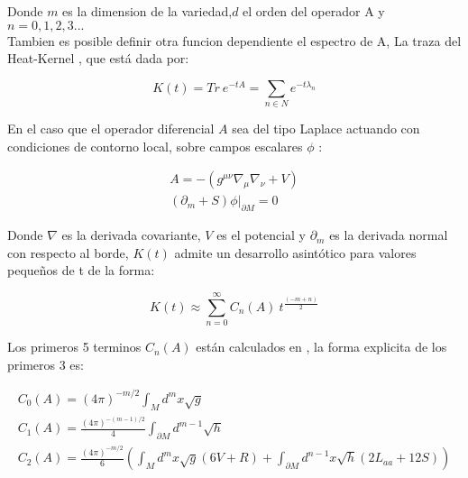 Donde $m$ es la dimension de la variedad,$d$ el orden del operador A y $n= 0,1,2,3 ...$ \\

Tambien es posible definir otra funcion dependiente el espectro de A, La traza del Heat-Kernel \cite{VASSILEVICH2003279}, que está dada por:

\begin{equation}
K (t) =  Tr \ e ^{-t A} = 
\sum _{n  \in N} e ^{-t \lambda _{n} }
\end{equation}

En el caso que el operador diferencial $A$ sea del tipo Laplace actuando con condiciones de contorno local, sobre campos escalares $\phi $ :

\begin{equation}
\begin{array}{c}

A = - \left(
			g ^{\mu \nu} \nabla _{\mu} \nabla _{\nu} + V
			\right) \\
\left (\partial _m + S \right) \phi | _{\partial M} = 0

			

\end{array}
\end{equation}

Donde $\nabla$ es la derivada covariante, $V$ es el potencial y $\partial _m$ es la derivada normal con respecto al borde, $K(t)$ admite un desarrollo asintótico para valores pequeños de t  de la forma:

\begin{equation}
K(t) \approx 
\sum _{n=0} ^{\infty}
C _n (A) \ 
t ^{\frac{(-m+n)}{2}}
\label{eq.heat.expansion}
\end{equation}



Los primeros 5 terminos $C _n (A) $ están calculados en \cite{VASSILEVICH2003279}, la forma explicita de los primeros 3 es: 

\begin{equation}
\begin{array}{c}
C _0 (A) = (4 \pi ) ^{-m/2}  \int _M d ^m x \sqrt{g}  \\
C _1 (A) = \frac{(4 \pi) ^{-(m-1)/2} }{4} \int _{\partial M } d ^{m-1} \sqrt{h} \\
C _2 (A) = \frac{(4 \pi) ^{-m/2} }{6} \left(
									\int _M d ^m x\sqrt{g} (6 V + R) +
									\int _{\partial M } d ^{n-1} x 
									\sqrt{h} (2 L _{aa}  + 12 S)
									\right)
\end{array}
\end{equation} 

